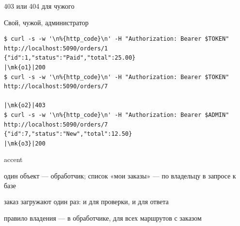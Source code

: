 \documentclass[aspectratio=169,10pt,t]{beamer}
\newcommand{\termsm}{\ttfamily\fontsize{6.6}{7.9}\selectfont}
\newcommand{\mk}[1]{\tikz[remember picture,overlay]\coordinate (#1) at (0,0.55ex);}
\begin{document}
\begin{frame}{403 или 404 для чужого}
  \slidetop

  \slidegap
\end{frame}

\begin{frame}[fragile]{Свой, чужой, администратор}
  \vspace{0.3em}
\begin{lstlisting}[style=term,basicstyle=\termsm,escapechar=|]
$ curl -s -w '\n%{http_code}\n' -H "Authorization: Bearer $TOKEN" http://localhost:5090/orders/1
{"id":1,"status":"Paid","total":25.00}
|\mk{o1}|200
$ curl -s -w '\n%{http_code}\n' -H "Authorization: Bearer $TOKEN" http://localhost:5090/orders/7

|\mk{o2}|403
$ curl -s -w '\n%{http_code}\n' -H "Authorization: Bearer $ADMIN" http://localhost:5090/orders/7
{"id":7,"status":"New","total":12.50}
|\mk{o3}|200
\end{lstlisting}

  \begin{cbul}{accent}
    \item один объект --- обработчик; список «мои заказы» ---  по владельцу
      в запросе к базе
    \item заказ загружают один раз: и для проверки, и для ответа
    \item правило владения --- в  обработчике, для всех маршрутов с заказом
  \end{cbul}
\end{frame}
\end{document}
